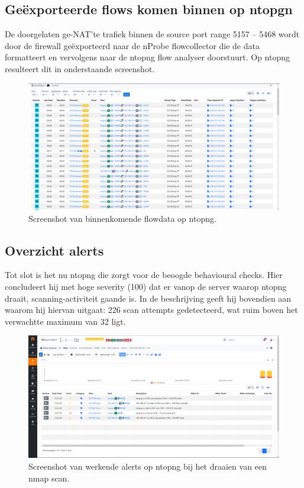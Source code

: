 \subsection{Geëxporteerde flows komen binnen op ntopgn}
De doorgelaten ge-NAT’te trafiek binnen de source port range 5157 – 5468 wordt door de firewall geëxporteerd naar de nProbe flowcollector die de data formatteert en vervolgens naar de ntopng flow analyser doorstuurt. Op ntopng resulteert dit in onderstaande screenshot.

\begin{figure}[htb]
    \includegraphics[width=\textwidth]{graphics/nmap_scan_flows.PNG}
    \caption[ntopng met toekomende flows]{Screenshot van binnenkomende flowdata op ntopng.}
    \label{fig:ntopngFlows}
\end{figure}

\subsection{Overzicht alerts}
Tot slot is het nu ntopng die zorgt voor de beoogde behavioural checks. Hier concludeert hij met hoge severity (100) dat er vanop de server waarop ntopng draait, scanning-activiteit gaande is. In de beschrijving geeft hij bovendien aan waarom hij hiervan uitgaat: 226 scan attempts gedetecteerd, wat ruim boven het verwachtte maximum van 32 ligt.

\begin{figure}[htb]
    \includegraphics[width=\textwidth]{graphics/nmap_scan.PNG}
    \caption[ntopng scan alerts]{Screenshot van werkende alerts op ntopng bij het draaien van een nmap scan.}
    \label{fig:ntopngAlerts}
\end{figure}
